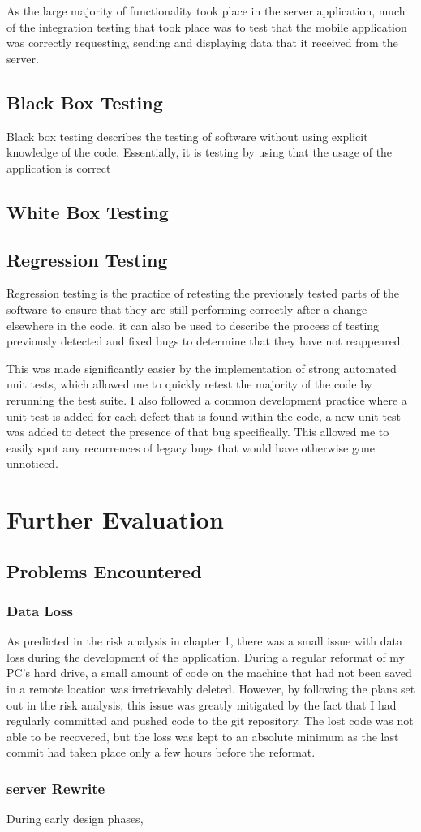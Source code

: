 As the large majority of functionality took place in the server application, much of the integration testing that took place was to test that the mobile application was correctly requesting, sending and displaying data that it received from the server.


\subsection{Black Box Testing}
Black box testing describes the testing of software without using explicit knowledge of the code.
Essentially, it is testing by using that the usage of the application is correct

\subsection{White Box Testing}


\subsection{Regression Testing}
Regression testing is the practice of retesting the previously tested parts of the software to ensure that they are still performing correctly after a change elsewhere in the code, it can also be used to describe the process of testing previously detected and fixed bugs to determine that they have not reappeared.

This was made significantly easier by the implementation of strong automated unit tests, which allowed me to quickly retest the majority of the code by rerunning the test suite.
I also followed a common development practice where a unit test is added for each defect that is found within the code, a new unit test was added to detect the presence of that bug specifically. 
This allowed me to easily spot any recurrences of legacy bugs that would have otherwise gone unnoticed.

\section{Further Evaluation}
\subsection{Problems Encountered}
\subsubsection{Data Loss}
As predicted in the risk analysis in chapter 1, there was a small issue with data loss during the development of the application.
During a regular reformat of my PC's hard drive, a small amount of code on the machine that had not been saved in a remote location was irretrievably deleted.
However, by following the plans set out in the risk analysis, this issue was greatly mitigated by the fact that I had regularly committed and pushed code to the git repository. 
The lost code was not able to be recovered, but the loss was kept to an absolute minimum as the last commit had taken place only a few hours before the reformat.

\subsubsection{server Rewrite}
During early design phases, 